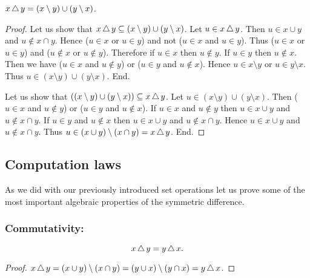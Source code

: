 \documentclass[../../set-theory.ftl.tex]{subfiles}
\begin{document}
  \begin{forthel}
    \begin{proposition}\label{SetTheory_01_04_470605}
      $x \mathop{\triangle} y = (x \setminus y) \cup (y \setminus x)$.
    \end{proposition}
    \begin{proof}
      Let us show that $x \mathop{\triangle} y \subseteq (x \setminus y) \cup (y \setminus x)$.
        Let $u \in x \mathop{\triangle} y$.
        Then $u \in x \cup y$ and $u \notin x \cap y$.
        Hence ($u \in x$ or $u \in y$) and not ($u \in x$ and $u \in y$).
        Thus ($u \in x$ or $u \in y$) and ($u \notin x$ or $u \notin y$).
        Therefore if $u \in x$ then $u \notin y$.
        If $u \in y$ then $u \notin x$.
        Then we have ($u \in x$ and $u \notin y$) or ($u \in y$ and
        $u \notin x$).
        Hence $u \in x \setminus y$ or $u \in y \setminus x$.
        Thus $u \in (x \setminus y) \cup (y \setminus x)$.
      End.

      Let us show that $((x \setminus y) \cup (y \setminus x)) \subseteq x \mathop{\triangle} y$.
        Let $u \in (x \setminus y) \cup (y \setminus x)$.
        Then ($u \in x$ and $u \notin y$) or ($u \in y$ and $u \notin x$).
        If $u \in x$ and $u \notin y$ then $u \in x \cup y$ and
        $u \notin x \cap y$.
        If $u \in y$ and $u \notin x$ then $u \in x \cup y$ and
        $u \notin x \cap y$.
        Hence $u \in x \cup y$ and $u \notin x \cap y$.
        Thus $u \in (x \cup y) \setminus (x \cap y) = x \mathop{\triangle} y$.
      End.
    \end{proof}
  \end{forthel}


  \subsection{Computation laws}

  \noindent As we did with our previously introduced set operations let us
  prove some of the most important algebraic properties of the symmetric
  difference.


  \subsubsection*{Commutativity:}

  \begin{forthel}
    \begin{proposition}\label{SetTheory_01_04_688675}
      \[ x \mathop{\triangle} y = y \mathop{\triangle} x. \]
    \end{proposition}
    \begin{proof}
      $x \mathop{\triangle} y
      = (x \cup y) \setminus (x \cap y)
      = (y \cup x) \setminus (y \cap x)
      = y \mathop{\triangle} x$.
    \end{proof}
  \end{forthel}
\end{document}
